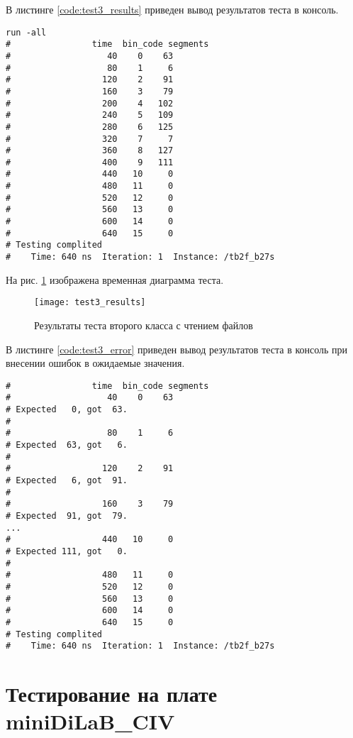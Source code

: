 В листинге \ref{code:test3_results} приведен вывод результатов теста в консоль.
\begin{lstlisting}[caption=Результаты теста второго класса с чтением файлов, label=code:test3_results, style=console]
run -all
# 		         time  bin_code segments
#                   40    0    63
#                   80    1     6
#                  120    2    91
#                  160    3    79
#                  200    4   102
#                  240    5   109
#                  280    6   125
#                  320    7     7
#                  360    8   127
#                  400    9   111
#                  440   10     0
#                  480   11     0
#                  520   12     0
#                  560   13     0
#                  600   14     0
#                  640   15     0
# Testing complited
#    Time: 640 ns  Iteration: 1  Instance: /tb2f_b27s
\end{lstlisting}

На рис. \ref{fig:test3_results} изображена временная диаграмма теста.
\begin{figure}[H]
	\begin{center}
		\texttt{[image: test3\_results]}
		\caption{Результаты теста второго класса с чтением файлов}
		\label{fig:test3_results}
	\end{center}
\end{figure}

В листинге \ref{code:test3_error} приведен вывод результатов теста в консоль при внесении ошибок в ожидаемые значения.
\begin{lstlisting}[caption=Результаты ошибочного теста второго класса с чтением файлов, label=code:test3_error, style=console]
# 		         time  bin_code segments
#                   40    0    63
# Expected   0, got  63.
# 
#                   80    1     6
# Expected  63, got   6.
# 
#                  120    2    91
# Expected   6, got  91.
# 
#                  160    3    79
# Expected  91, got  79.
...
#                  440   10     0
# Expected 111, got   0.
# 
#                  480   11     0
#                  520   12     0
#                  560   13     0
#                  600   14     0
#                  640   15     0
# Testing complited
#    Time: 640 ns  Iteration: 1  Instance: /tb2f_b27s
\end{lstlisting}

\section{Тестирование на плате miniDiLaB\_CIV}

